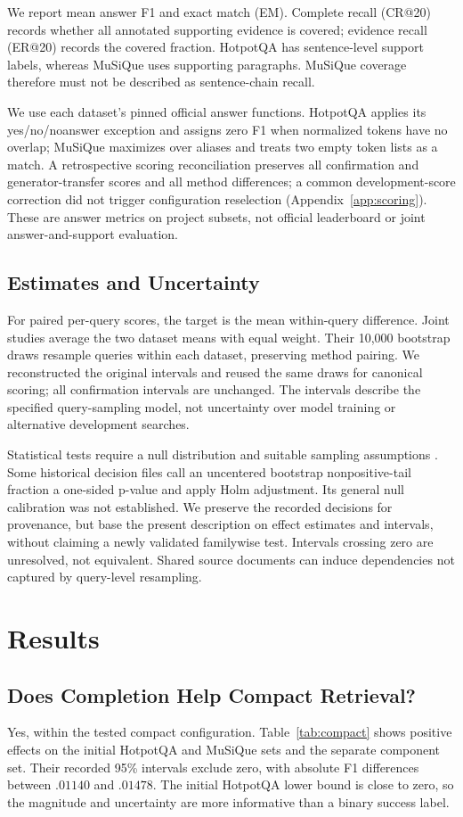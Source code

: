 \documentclass[11pt]{article}
\begin{document}
We report mean answer F1 and exact match (EM). Complete recall (CR@20)
records whether all annotated supporting evidence is covered; evidence recall
(ER@20) records the covered fraction. HotpotQA has sentence-level support
labels, whereas MuSiQue uses supporting paragraphs. MuSiQue coverage therefore
must not be described as sentence-chain recall.

We use each dataset's pinned official answer functions. HotpotQA applies
its yes/no/noanswer exception and assigns zero
F1 when normalized tokens have no overlap; MuSiQue maximizes over aliases
and treats two empty token lists as a match. A retrospective scoring
reconciliation preserves all confirmation and generator-transfer scores and
all method differences; a common development-score correction did not trigger
configuration reselection (Appendix~\ref{app:scoring}). These are answer
metrics on project subsets, not official leaderboard or joint
answer-and-support evaluation.

\subsection{Estimates and Uncertainty}
For paired per-query scores, the target is the mean within-query difference.
Joint studies average the two dataset means with equal weight. Their 10,000
bootstrap draws resample queries within each dataset, preserving method
pairing. We reconstructed the original intervals and reused the same draws
for canonical scoring; all confirmation intervals are unchanged.
The intervals describe the specified query-sampling model,
not uncertainty over model training or alternative development searches.

Statistical tests require a null distribution and suitable sampling assumptions
\citep{dror2018hitchhiker}. Some historical decision files call an uncentered
bootstrap nonpositive-tail fraction a one-sided p-value and apply Holm
adjustment. Its general null calibration was not established. We preserve the
recorded decisions for provenance, but base the present description on effect
estimates and intervals, without claiming a newly validated familywise test.
Intervals crossing zero are unresolved, not equivalent. Shared source
documents can induce dependencies not captured by query-level resampling.

\section{Results}
\subsection{Does Completion Help Compact Retrieval?}
Yes, within the tested compact configuration. Table~\ref{tab:compact} shows
positive effects on the initial HotpotQA and MuSiQue sets and the separate
component set. Their recorded 95\% intervals exclude zero, with absolute
F1 differences between $.01140$ and $.01478$. The initial HotpotQA lower
bound is close to zero, so the magnitude and uncertainty are more informative
than a binary success label.
\end{document}
